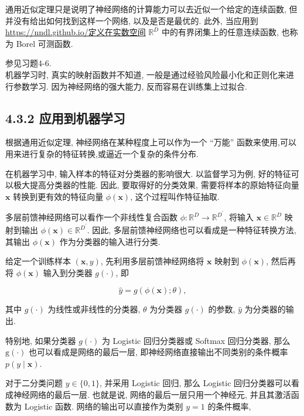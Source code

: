 \documentclass[10pt]{article}
\begin{document}
通用近似定理只是说明了神经网络的计算能力可以去近似一个给定的连续函数, 但并没有给出如何找到这样一个网络, 以及是否是最优的. 此外, 当应用到 \href{https://nndl.github.io/%E5%AE%9A%E4%B9%89%E5%9C%A8%E5%AE%9E%E6%95%B0%E7%A9%BA%E9%97%B4}{https://nndl.github.io/定义在实数空间} $\mathbb{R}^{D}$ 中的有界闭集上的任意连续函数, 也称为 Borel 可测函数.

参见习题4-6.\\
机器学习时, 真实的映射函数并不知道, 一般是通过经验风险最小化和正则化来进行参数学习. 因为神经网络的强大能力, 反而容易在训练集上过拟合.

\subsection*{4.3.2 应用到机器学习}
根据通用近似定理, 神经网络在某种程度上可以作为一个 “万能” 函数来使用,可以用来进行复杂的特征转换,或逼近一个复杂的条件分布.

在机器学习中, 输入样本的特征对分类器的影响很大. 以监督学习为例, 好的特征可以极大提高分类器的性能. 因此, 要取得好的分类效果, 需要将样本的原始特征向量 $\boldsymbol{x}$ 转换到更有效的特征向量 $\phi(\boldsymbol{x})$, 这个过程叫作特征抽取.

多层前馈神经网络可以看作一个非线性复合函数 $\phi: \mathbb{R}^{D} \rightarrow \mathbb{R}^{D^{\prime}}$, 将输入 $\boldsymbol{x} \in \mathbb{R}^{D}$ 映射到输出 $\phi(\boldsymbol{x}) \in \mathbb{R}^{D^{\prime}}$. 因此, 多层前馈神经网络也可以看成是一种特征转换方法, 其输出 $\phi(\boldsymbol{x})$ 作为分类器的输入进行分类.

给定一个训练样本 $(\boldsymbol{x}, y)$, 先利用多层前馈神经网络将 $\boldsymbol{x}$ 映射到 $\phi(\boldsymbol{x})$, 然后再将 $\phi(\boldsymbol{x})$ 输入到分类器 $g(\cdot)$, 即


\begin{equation*}
\hat{y}=g(\phi(\boldsymbol{x}) ; \theta), \tag{4.39}
\end{equation*}


其中 $g(\cdot)$ 为线性或非线性的分类器, $\theta$ 为分类器 $g(\cdot)$ 的参数, $\hat{y}$ 为分类器的输出.

特别地, 如果分类器 $g(\cdot)$ 为 Logistic 回归分类器或 Softmax 回归分类器, 那么 $\mathrm{g}(\cdot)$ 也可以看成是网络的最后一层, 即神经网络直接输出不同类别的条件概率 $p(y \mid \boldsymbol{x})$.

对于二分类问题 $y \in\{0,1\}$, 并采用 Logistic 回归, 那么 Logistic 回归分类器可以看成神经网络的最后一层. 也就是说, 网络的最后一层只用一个神经元, 并且其激活函数为 Logistic 函数. 网络的输出可以直接作为类别 $y=1$ 的条件概率,
\end{document}
